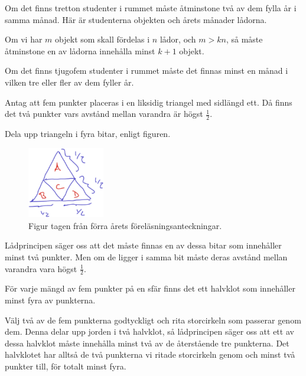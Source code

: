 \documentclass[nobib]{tufte-handout}
\begin{document}
\begin{example}
  Om det finns tretton studenter i rummet måste åtminstone två av dem fylla år i samma månad. Här är studenterna objekten och årets månader lådorna.
\end{example}

\begin{theorem}
  Om vi har $m$ objekt som skall fördelas i $n$ lådor, och $m > kn$, så måste åtminstone en av lådorna innehålla minst $k+1$ objekt.
\end{theorem}

\begin{example}
  Om det finns tjugofem studenter i rummet måste det finnas minst en månad i vilken tre eller fler av dem fyller år.
\end{example}

\begin{example}
  Antag att fem punkter placeras i en liksidig triangel med sidlängd ett. Då finns det två punkter vars avstånd mellan varandra är högst $\frac{1}{2}$.

  Dela upp triangeln i fyra bitar, enligt figuren.
  \begin{figure}
    \centering
    \includegraphics[width = 0.3\textwidth]{graphics/pigeonhole_principle_equilat_triangle.png}
    \caption{Figur tagen från förra årets föreläsningsanteckningar.}
  \end{figure}
  Lådprincipen säger oss att det måste finnas en av dessa bitar som innehåller minst två punkter. Men om de ligger i samma bit måste deras avstånd mellan varandra vara högst $\frac{1}{2}$.
\end{example}

\begin{example}
  För varje mängd av fem punkter på en sfär finns det ett halvklot som innehåller minst fyra av punkterna.

  Välj två av de fem punkterna godtyckligt och rita storcirkeln som passerar genom dem. Denna delar upp jorden i två halvklot, så lådprincipen säger oss att ett av dessa halvklot måste innehålla minst två av de återstående tre punkterna. Det halvklotet har alltså de två punkterna vi ritade storcirkeln genom och minst två punkter till, för totalt minst fyra.
\end{example}
\end{document}

